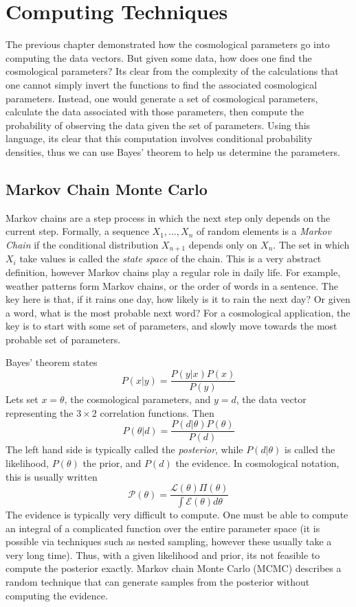\chapter{Computing Techniques}
The previous chapter demonstrated how the cosmological parameters go into computing the data vectors. But given some data, how does one find the cosmological parameters? Its clear from the complexity of the calculations that one cannot simply invert the functions to find the associated cosmological parameters. Instead, one would generate a set of cosmological parameters, calculate the data associated with those parameters, then compute the probability of observing the data given the set of parameters. Using this language, its clear that this computation involves conditional probability densities, thus we can use Bayes' theorem to help us determine the parameters.

\section{Markov Chain Monte Carlo}
Markov chains are a step process in which the next step only depends on the current step. Formally, a
sequence $X_1,\hdots,X_n$ of random elements is a \textit{Markov Chain} if the conditional distribution $X_{n+1}$ depends only on $X_n$. The set in which $X_i$ take values is called the \textit{state space} of the chain. This is a very abstract definition, however Markov chains play a regular role in daily life. For example, weather patterns form Markov chains, or the order of words in a sentence. The key here is that, if it rains one day, how likely is it to rain the next day? Or given a word, what is the most probable next word? For a cosmological application, the key is to start with some set of parameters, and slowly move towards the most probable set of parameters.

Bayes' theorem states
\begin{equation}
	P(x|y) = \frac{P(y|x) P(x)}{P(y)}
\end{equation}
Lets set $x=\theta$, the cosmological parameters, and $y=d$, the data vector representing the $3\times 2$ correlation functions. Then
\begin{equation}
	P(\theta|d) = \frac{P(d|\theta) P(\theta)}{P(d)}
\end{equation}
The left hand side is typically called the \textit{posterior}, while $P(d|\theta)$ is called the likelihood, $P(\theta)$ the prior, and $P(d)$ the evidence. In cosmological notation, this is usually written
\begin{equation}
	\mathcal{P}(\theta) = \frac{\mathcal{L}(\theta) \Pi(\theta)}{\int\mathcal{E}(\theta)d\theta}
\end{equation}
The evidence is typically very difficult to compute. One must be able to compute an integral of a complicated function over the entire parameter space (it is possible via techniques such as nested sampling, however these usually take a very long time). Thus, with a given likelihood and prior, its not feasible to compute the posterior exactly. Markov chain Monte Carlo (MCMC) describes a random technique that can generate samples from the posterior without computing the evidence.
